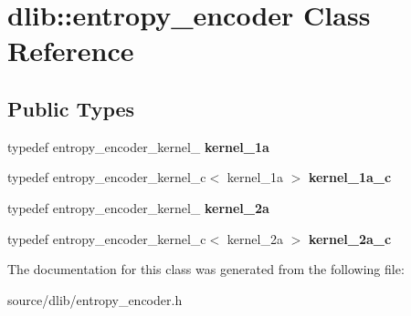 \hypertarget{classdlib_1_1entropy__encoder}{
\section{dlib::entropy\_\-encoder Class Reference}
\label{classdlib_1_1entropy__encoder}
}
\subsection*{Public Types}
\begin{DoxyCompactItemize}
\item 
\hypertarget{classdlib_1_1entropy__encoder_a6a75b09b663d75271eb52b3251a61184}{
typedef entropy\_\-encoder\_\-kernel\_ {\bfseries kernel\_\-1a}}
\label{classdlib_1_1entropy__encoder_a6a75b09b663d75271eb52b3251a61184}

\item 
\hypertarget{classdlib_1_1entropy__encoder_a3ddb2f06e846e0c096e61a768bda1ec5}{
typedef entropy\_\-encoder\_\-kernel\_\-c$<$ kernel\_\-1a $>$ {\bfseries kernel\_\-1a\_\-c}}
\label{classdlib_1_1entropy__encoder_a3ddb2f06e846e0c096e61a768bda1ec5}

\item 
\hypertarget{classdlib_1_1entropy__encoder_a38fe35a19eda6e5b05482a43911ede17}{
typedef entropy\_\-encoder\_\-kernel\_ {\bfseries kernel\_\-2a}}
\label{classdlib_1_1entropy__encoder_a38fe35a19eda6e5b05482a43911ede17}

\item 
\hypertarget{classdlib_1_1entropy__encoder_a92b57876edb98c24d52412ee97b208a2}{
typedef entropy\_\-encoder\_\-kernel\_\-c$<$ kernel\_\-2a $>$ {\bfseries kernel\_\-2a\_\-c}}
\label{classdlib_1_1entropy__encoder_a92b57876edb98c24d52412ee97b208a2}

\end{DoxyCompactItemize}


The documentation for this class was generated from the following file:\begin{DoxyCompactItemize}
\item 
source/dlib/entropy\_\-encoder.h\end{DoxyCompactItemize}
